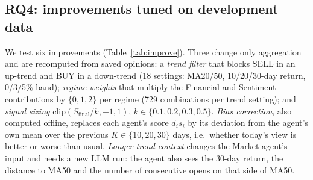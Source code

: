 \documentclass[11pt]{article}
\newcommand{\Sfinal}{S_{\text{final}}}
\begin{document}
\subsection{RQ4: improvements tuned on development data}
\label{sec:rq4}

\begin{table}[t]
\centering
\small
\setlength{\tabcolsep}{3pt}
\caption{Average return (\%) of improvements: each is selected on the development set (Dev) and evaluated once on test.
The three variants that need new LLM runs were not run on test because they did not improve on dev.}
\label{tab:improve}
\end{table}

We test six improvements (Table~\ref{tab:improve}). Three change only aggregation and are recomputed from saved
opinions: a \emph{trend filter} that blocks SELL in an up-trend and BUY in a down-trend (18 settings: MA20/50,
10/20/30-day return, 0/3/5\% band); \emph{regime weights} that multiply the Financial and Sentiment contributions by
$\{0,1,2\}$ per regime (729 combinations per trend setting); and \emph{signal sizing} $\mathrm{clip}(\Sfinal/k,-1,1)$,
$k\in\{0.1,0.2,0.3,0.5\}$. \emph{Bias correction}, also computed offline, replaces each agent's score $d_i s_i$ by its
deviation from the agent's own mean over the previous $K\in\{10,20,30\}$ days, i.e.\ whether today's view is better or
worse than usual. \emph{Longer trend context} changes the Market agent's input and needs a new LLM run: the agent also
sees the 30-day return, the distance to MA50 and the number of consecutive opens on that side of MA50.
\end{document}
